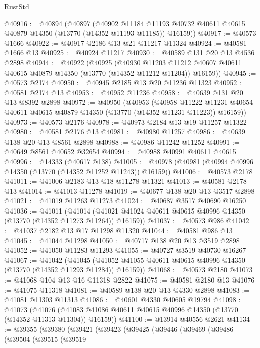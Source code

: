 \begin{lexlean}{RustStd}
\begin{coremodule}
@40916 := @40894
    (@40897
      (@40902
        @11184
        @11193
        @40732
        @40611
        @40615
        @40879
        @14350
        (@13770 (@14352 @11193 @11185))
        @16159))
@40917 := @40573 @1666
@40922 := @40917 @2186 @13 @21 @11217 @11324
@40924 := @40581 @1666 @13
@40925 := @40924 @11217
@40930 := @40589 @131 @20 @13 @4536 @2898
@40944 := @40922
    (@40925
      (@40930
        @11203
        @11212
        @40607
        @40611
        @40615
        @40879
        @14350
        (@13770 (@14352 @11212 @11204))
        @16159))
@40945 := @40573 @2174
@40950 := @40945 @2185 @13 @20 @11236 @11323
@40952 := @40581 @2174 @13
@40953 := @40952 @11236
@40958 := @40639 @131 @20 @13 @8392 @2898
@40972 := @40950
    (@40953
      (@40958
        @11222
        @11231
        @40654
        @40611
        @40615
        @40879
        @14350
        (@13770 (@14352 @11231 @11223))
        @16159))
@40973 := @40573 @2176
@40978 := @40973 @2184 @13 @19 @11257 @11322
@40980 := @40581 @2176 @13
@40981 := @40980 @11257
@40986 := @40639 @138 @20 @13 @8561 @2898
@40988 := @40986 @11242 @11252
@40991 := @40649 @8561 @40652 @32654
@40994 := @40988 @40991 @40611 @40615
@40996 := @14333 (@40617 @138)
@41005 := @40978 (@40981 (@40994 @40996 @14350 (@13770 (@14352 @11252 @11243)) @16159))
@41006 := @40573 @2178
@41011 := @41006 @2183 @13 @18 @11278 @11321
@41013 := @40581 @2178 @13
@41014 := @41013 @11278
@41019 := @40677 @138 @20 @13 @3517 @2898
@41021 := @41019 @11263 @11273
@41024 := @40687 @3517 @40690 @16250
@41036 := @41011
    (@41014 (@41021 @41024 @40611 @40615 @40996 @14350 (@13770 (@14352 @11273 @11264)) @16159))
@41037 := @40573 @986
@41042 := @41037 @2182 @13 @17 @11298 @11320
@41044 := @40581 @986 @13
@41045 := @41044 @11298
@41050 := @40717 @138 @20 @13 @3519 @2898
@41052 := @41050 @11283 @11293
@41055 := @40727 @3519 @40730 @16267
@41067 := @41042
    (@41045 (@41052 @41055 @40611 @40615 @40996 @14350 (@13770 (@14352 @11293 @11284)) @16159))
@41068 := @40573 @2180
@41073 := @41068 @104 @13 @16 @11318 @2822
@41075 := @40581 @2180 @13
@41076 := @41075 @11318
@41081 := @40589 @138 @20 @13 @4330 @2898
@41083 := @41081 @11303 @11313
@41086 := @40601 @4330 @40605 @19794
@41098 := @41073
    (@41076 (@41083 @41086 @40611 @40615 @40996 @14350 (@13770 (@14352 @11313 @11304)) @16159))
@41100 := @13914 @40556 @2621
@41134 := @39355
    (@39380
      (@39421
        (@39423
          (@39425
            (@39446
              (@39469
                (@39486
                  (@39504
                    (@39515
                      (@39519

\end{coremodule}
\end{lexlean}
